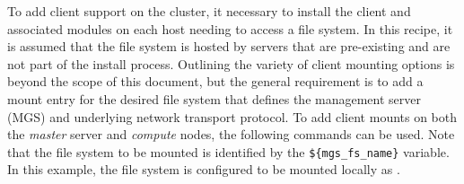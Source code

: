 To add \Lustre{} client support on the cluster, it necessary to install the client
and associated modules on each host needing to access a \Lustre{} file system. In
this recipe, it is assumed that the \Lustre{} file system is hosted by servers
that are pre-existing and are not part of the install process. Outlining the
variety of \Lustre{} client mounting options is beyond the scope of this document,
but the general requirement is to add a mount entry for the desired file system
that defines the management server (MGS) and underlying network transport
protocol. To add client mounts on both the {\em master} server and {\em
compute} nodes, the following commands can be used. Note that the \Lustre{} file
system to be mounted is identified by the \texttt{\$\{mgs\_fs\_name\}} variable. 
In this example, the file system is configured to be mounted locally
as .
